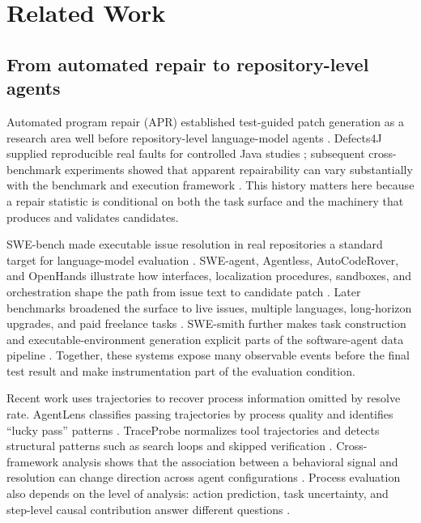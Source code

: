 \section{Related Work}
\label{sec:related-work}

\subsection{From automated repair to repository-level agents}

Automated program repair (APR) established test-guided patch generation as a research area well before repository-level language-model agents \citep{monperrus2018bibliography,gazzola2019survey}. Defects4J supplied reproducible real faults for controlled Java studies \citep{just2014defects4j}; subsequent cross-benchmark experiments showed that apparent repairability can vary substantially with the benchmark and execution framework \citep{durieux2019repairthemall,ye2019quixbugs}. This history matters here because a repair statistic is conditional on both the task surface and the machinery that produces and validates candidates.

SWE-bench made executable issue resolution in real repositories a standard target for language-model evaluation \citep{jimenez2024swebench}. SWE-agent, Agentless, AutoCodeRover, and OpenHands illustrate how interfaces, localization procedures, sandboxes, and orchestration shape the path from issue text to candidate patch \citep{yang2024sweagent,xia2024agentless,zhang2024autocoderover,wang2025openhands}. Later benchmarks broadened the surface to live issues, multiple languages, long-horizon upgrades, and paid freelance tasks \citep{zhang2025swebenchlive,rashid2025swepolybench,thai2025sweevo,xu2026roadmapbench,miserendino2025swelancer}. SWE-smith further makes task construction and executable-environment generation explicit parts of the software-agent data pipeline \citep{yang2025swesmith}. Together, these systems expose many observable events before the final test result and make instrumentation part of the evaluation condition.

Recent work uses trajectories to recover process information omitted by resolve rate. AgentLens classifies passing trajectories by process quality and identifies ``lucky pass'' patterns \citep{sahoo2026agentlens}. TraceProbe normalizes tool trajectories and detects structural patterns such as search loops and skipped verification \citep{shu2026traceprobe}. Cross-framework analysis shows that the association between a behavioral signal and resolution can change direction across agent configurations \citep{ma2026samesignal}. Process evaluation also depends on the level of analysis: action prediction, task uncertainty, and step-level causal contribution answer different questions \citep{he2026process}.


